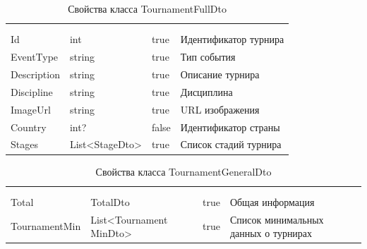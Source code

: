 \begin{xltabular}{\textwidth}{|X|X|X|X|}
	\caption{Свойства класса TournamentFullDto}\label{table:TournamentFullDto}\\ \hline
	 &  &  &  \\ \hline
	 &  &  &  \\ \hline
	\endfirsthead
	 \hline
	 &  &  &  \\ \hline
	\endhead
	Id & int & true & Идентификатор турнира \\ \hline
	EventType & string & true & Тип события \\ \hline
	Description & string & true & Описание турнира \\ \hline
	Discipline & string & true & Дисциплина \\ \hline
	ImageUrl & string & true & URL изображения \\ \hline
	Country & int? & false & Идентификатор страны \\ \hline
	Stages & List<StageDto> & true & Список стадий турнира \\ \hline
\end{xltabular}

\begin{xltabular}{\textwidth}{|X|X|X|X|}
	\caption{Свойства класса TournamentGeneralDto}\label{table:TournamentGeneralDto}\\ \hline
	 &  &  &  \\ \hline
	 &  &  &  \\ \hline
	\endfirsthead
	 \hline
	 &  &  &  \\ \hline
	\endhead
	Total & TotalDto & true & Общая информация \\ \hline
	TournamentMin & List<Tournament
	MinDto> & true & Список минимальных данных о турнирах \\ \hline
\end{xltabular}

